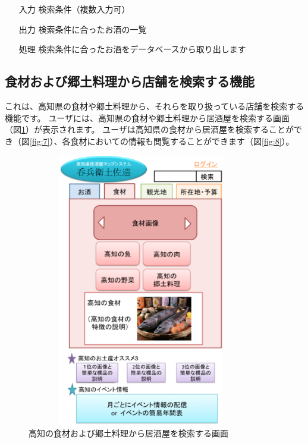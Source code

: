 \documentclass[a4j,titlepage]{jarticle}
\begin{document}
\begin{enumerate}
\item [入力] 検索条件（複数入力可）
\item [出力] 検索条件に合ったお酒の一覧
\item [処理] 検索条件に合ったお酒をデータベースから取り出します
\end{enumerate}


\subsection{食材および郷土料理から店舗を検索する機能}
これは、高知県の食材や郷土料理から、それらを取り扱っている店舗を検索する機能です。
ユーザには、高知県の食材や郷土料理から居酒屋を検索する画面（図\ref{fig:6}）が表示されます。
ユーザは高知県の食材から居酒屋を検索することができ（図\ref{fig:7}）、各食材においての情報も閲覧することができます（図\ref{fig:8}）。

\begin {figure}[htbp]
    \begin{center}
    \includegraphics [height=12cm, width=10cm]{extrnal_design_document_image/6.eps}
    \caption {高知の食材および郷土料理から居酒屋を検索する画面}
    \label {fig:6}
    \end{center}
\end {figure}
\end{document}
